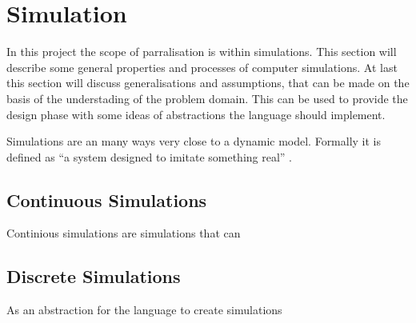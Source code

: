 \chapter{Simulation}
In this project the scope of parralisation is within simulations. This section will describe some general properties and processes of computer simulations. At last this section will discuss generalisations and assumptions, that can be made on the basis of the understading of the problem domain. This can be used to provide the design phase with some ideas of abstractions the language should implement.

Simulations are an many ways very close to a dynamic model. Formally it is defined as \enquote{a system designed to imitate something real} .

\section{Continuous Simulations}
Continious simulations are simulations that can 

\section{Discrete Simulations}


\label{simulationchoise}
As an abstraction for the language to create simulations

